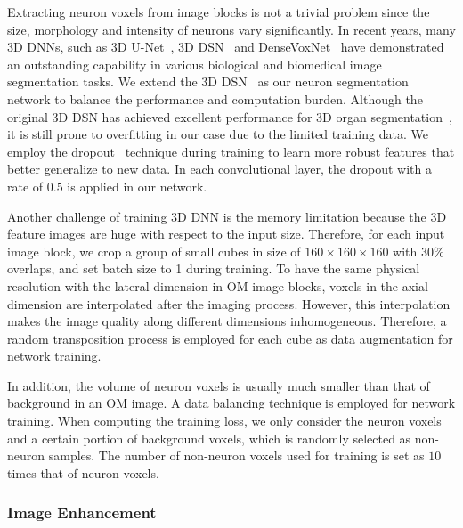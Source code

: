 Extracting neuron voxels from image blocks is not a trivial problem since the size, morphology and intensity of neurons vary significantly.
In recent years, many 3D DNNs, such as 3D U-Net~\cite{Cicek2016}, 3D DSN~\cite{Dou2017} and DenseVoxNet~\cite{Yu2017} have demonstrated an outstanding capability in various biological and biomedical image segmentation tasks.
We extend the 3D DSN~\cite{Dou2017} as our neuron segmentation network to balance the performance and computation burden.
%
Although the original 3D DSN has achieved excellent performance for 3D organ segmentation~\cite{Dou2017}, it is still prone to overfitting in our case due to the limited training data. 
We employ the dropout~\cite{Srivastava2014} technique during training to learn more robust features that better generalize to new data.
In each convolutional layer, the dropout with a rate of $0.5$ is applied in our network. 



Another challenge of training 3D DNN is the memory limitation because the 3D feature images are huge with respect to the input size. Therefore, for each input image block, we crop a group of small cubes in size of $160\times 160\times 160$ with $30\%$ overlaps, and set batch size to 1 during training. 
%
To have the same physical resolution with the lateral dimension in OM image blocks, voxels in the axial dimension are interpolated after the imaging process. However, this interpolation makes the image quality along different dimensions inhomogeneous. 
Therefore, a random transposition process is employed for each cube as data augmentation for network training.


In addition, the volume of neuron voxels is usually much smaller than that of background in an OM image.
A data balancing technique is employed for network training.
When computing the training loss, we only consider the neuron voxels and a certain portion of background voxels, which is randomly selected as non-neuron samples.
The number of non-neuron voxels used for training is set as $10$ times that of neuron voxels.


\subsubsection{Image Enhancement}
\label{sec:enhancement}

